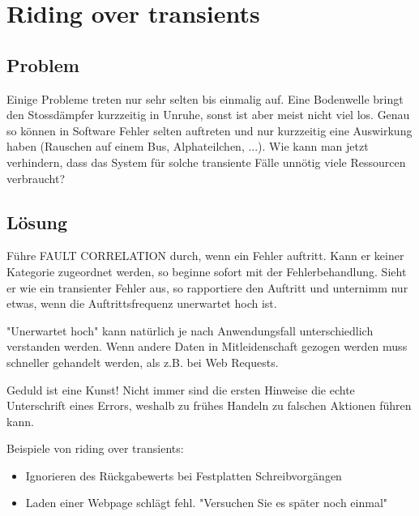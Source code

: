 \section{Riding over transients}


\subsection{Problem}


Einige Probleme treten nur sehr selten bis einmalig auf. Eine Bodenwelle bringt den Stossdämpfer kurzzeitig in Unruhe, sonst ist aber meist nicht viel los. Genau so können in Software Fehler selten auftreten und nur kurzzeitig eine Auswirkung haben (Rauschen auf einem Bus, Alphateilchen, ...). Wie kann man jetzt verhindern, dass das System für solche transiente Fälle unnötig viele Ressourcen verbraucht?

\subsection{Lösung}


Führe FAULT CORRELATION durch, wenn ein Fehler auftritt. Kann er keiner Kategorie zugeordnet werden, so beginne sofort mit der Fehlerbehandlung. Sieht er wie ein transienter Fehler aus, so rapportiere den Auftritt und unternimm nur etwas, wenn die Auftrittsfrequenz unerwartet hoch ist.

"Unerwartet hoch" kann natürlich je nach Anwendungsfall unterschiedlich verstanden werden. Wenn andere Daten in Mitleidenschaft gezogen werden muss schneller gehandelt werden, als z.B. bei Web Requests.

Geduld ist eine Kunst! Nicht immer sind die ersten Hinweise die echte Unterschrift eines Errors, weshalb zu frühes Handeln zu falschen Aktionen führen kann.

Beispiele von riding over transients:
\begin{itemize}
	\item Ignorieren des Rückgabewerts bei Festplatten Schreibvorgängen
	\item Laden einer Webpage schlägt fehl. "Versuchen Sie es später noch einmal"
\end{itemize}

